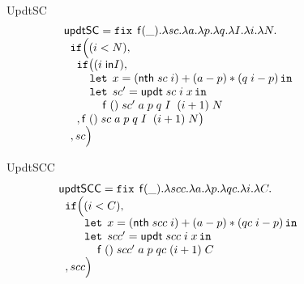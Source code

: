 \documentclass[a4paper,11pt]{article}
\theoremstyle{definition}
\begin{document}
\begin{figure}
\[\begin{array}{l}
\end{array}
\]

UpdtSC
\[
\begin{array}{l}
 \mathsf{updtSC} = \mathop{\mathtt{fix}} \;  \mathsf{f}(\_). \lambda sc. \lambda a. \lambda
  p. \lambda q.  \lambda I. \lambda i. \lambda N. \\
 \hspace{.2cm} \mathtt{if}   \Big (   (i < N)  ,  \\
 \hspace{0.4cm}  \mathtt{if} \big( ( i \; \mathsf{in} I  ) ,       \\
 \hspace{0.8cm} \mathop{\mathtt{let}} \; x =( \mathsf{nth} \; sc \; i) + (a-p)*(q
  \; i - p)  \mathop{ \mathtt{in}} \\
 \hspace{0.8cm} \mathop{\mathtt{let}} \; sc' =  \mathsf{updt} \; sc \; i
  \; x \mathop{ \mathtt{in}} \\
  \hspace{1.2cm} \mathsf{f}  \; () \; sc' \; a \; p
 \; q \; I \;  \; (i+1) \;  N  \\ 
\hspace{0.4cm}  ,  \mathsf{f}  \; () \; sc \; a \; p
 \; q \; I \;  \; (i+1) \;  N \big )  \\ 
\hspace{0.2cm}   ,  sc  \Big ) \\
 
\end{array}
\]

UpdtSCC
\[
\begin{array}{l}
 \mathsf{updtSCC} = \mathop{\mathtt{fix}} \;  \mathsf{f}(\_). \lambda scc. \lambda a. \lambda
  p. \lambda qc.  \lambda i. \lambda C. \\
 \hspace{.2cm} \mathtt{if}   \Big (   (i < C)  ,  \\
 \hspace{0.8cm} \mathop{\mathtt{let}} \; x =( \mathsf{nth} \; scc \; i) + (a-p)*(qc
  \; i - p)  \mathop{ \mathtt{in}} \\
 \hspace{0.8cm} \mathop{\mathtt{let}} \; scc' =  \mathsf{updt} \; scc \; i
  \; x \mathop{ \mathtt{in}} \\
  \hspace{1.2cm} \mathsf{f}  \; () \; scc' \; a \; p
 \; qc   \; (i+1) \;  C  \\ 
\hspace{0.2cm}   ,  scc  \Big ) \\
 

\end{array}\]
\end{figure}
\end{document}
